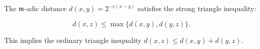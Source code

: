 The $\mathfrak{m}$-adic distance $d(x, y) = 2^{-v(x-y)}$ satisfies the strong triangle inequality:

$$d(x, z) \leq \max\{d(x, y), d(y, z)\}.$$

This implies the ordinary triangle inequality $d(x,z) \leq d(x,y) + d(y,z)$.